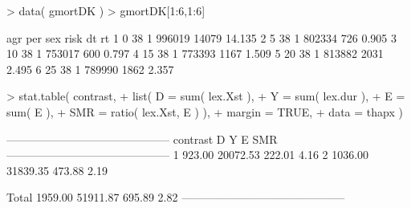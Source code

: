 \begin{frame}[fragile]
\begin{Schunk}
\begin{Sinput}
> data( gmortDK )
> gmortDK[1:6,1:6]
\end{Sinput}
\begin{Soutput}
  agr per sex   risk    dt     rt
1   0  38   1 996019 14079 14.135
2   5  38   1 802334   726  0.905
3  10  38   1 753017   600  0.797
4  15  38   1 773393  1167  1.509
5  20  38   1 813882  2031  2.495
6  25  38   1 789990  1862  2.357
\end{Soutput}
\end{Schunk}
\end{frame}

\begin{frame}[fragile]
\begin{Schunk}
\begin{Sinput}
> stat.table( contrast,
+             list( D = sum( lex.Xst ),
+                   Y = sum( lex.dur ),
+                   E = sum( E ),
+                 SMR = ratio( lex.Xst, E ) ),
+              margin = TRUE,
+                data = thapx )
\end{Sinput}
\begin{Soutput}
 -------------------------------------------- 
 contrast         D        Y       E     SMR  
 -------------------------------------------- 
 1           923.00 20072.53  222.01    4.16  
 2          1036.00 31839.35  473.88    2.19  
                                              
 Total      1959.00 51911.87  695.89    2.82  
 -------------------------------------------- 
\end{Soutput}
\end{Schunk}
\end{frame}

